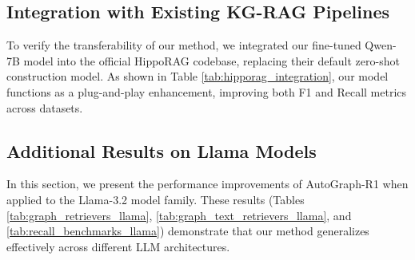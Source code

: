 \documentclass[11pt]{article}
\begin{document}
\subsection{Integration with Existing KG-RAG Pipelines}
To verify the transferability of our method, we integrated our fine-tuned Qwen-7B model into the official HippoRAG \citep{gutierrez_hipporag_2025} codebase, replacing their default zero-shot construction model. As shown in Table \ref{tab:hipporag_integration}, our model functions as a plug-and-play enhancement, improving both F1 and Recall metrics across datasets.
\begin{table}[p]
\small
\centering
\caption{Performance of the HippoRAG KG Construction pipeline when replacing the default KG constructor with our fine-tuned Qwen-7B model. The consistent improvement confirms that our optimized KG construction transfers benefits to established third-party RAG systems.}
\label{tab:hipporag_integration}
\end{table}

\subsection{Additional Results on Llama Models}
\label{sec:appendix_llama_result}

In this section, we present the performance improvements of AutoGraph-R1 when applied to the Llama-3.2 model family. These results (Tables \ref{tab:graph_retrievers_llama}, \ref{tab:graph_text_retrievers_llama}, and \ref{tab:recall_benchmarks_llama}) demonstrate that our method generalizes effectively across different LLM architectures.
\end{document}
